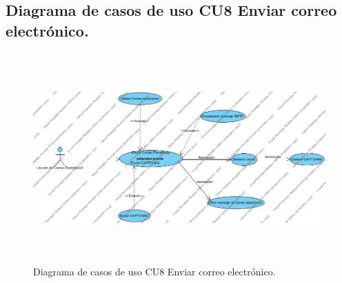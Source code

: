 \subsection{Diagrama de casos de uso CU8 Enviar correo electrónico.}
\begin{figure}[H]
	\includegraphics[width=1\linewidth, height=8cm]{./images/casodeuso10.jpg}
	\caption{Diagrama de casos de uso CU8 Enviar correo electrónico.}
	\label{fig:4-11-1}
\end{figure}
